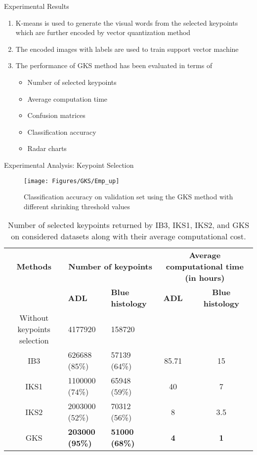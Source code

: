 \documentclass [9pt,times] {beamer}
\begin{document}
\begin{frame}{Experimental Results}
\begin{enumerate}
			\item K-means is used to generate the visual words from the selected keypoints which are further encoded by vector quantization method
			\item The encoded images with labels are used to train support vector machine			
			\item The performance of GKS method has been evaluated in terms of 
			\begin{itemize}
\fontsize{7pt}{9pt}\selectfont
			\item Number of selected keypoints
			\item Average computation time 
			\item Confusion matrices
			\item Classification accuracy
			\item Radar charts
			\end{itemize}
\end{enumerate}


\end{frame}

\begin{frame}[plain]{Experimental Analysis: Keypoint Selection}

\begin{figure}
			\centering
			\texttt{[image: Figures/GKS/Emp\_up]}
			\caption{{\scriptsize Classification accuracy on validation set using the GKS method with different shrinking threshold values}}\label{fig:emp}
\end{figure}



\begin{block}{}
\begin{table}
\centering
\scriptsize
\caption{{\scriptsize Number of selected keypoints returned by IB3, IKS1, IKS2, and GKS on considered datasets along with their average computational cost.}}
\begin{tabular}{cll|cc}
    \hline
    
\textbf{Methods}    & \multicolumn{2}{c}{ \textbf{Number of keypoints}} &  \multicolumn{2}{|c}{\textbf{Average computational time (in hours)}}   \\
\cline{2-5}
&\textbf{ADL}&\textbf{Blue histology}&\textbf{ADL}&\textbf{Blue histology}\\
\hline
Without keypoints selection        &    4177920    &    158720    \\
IB3 &  626688 (85\%) & 57139 (64\%) &85.71 & 15\\ 
IKS1        &    1100000 (74\%)    &    65948 (59\%)  & 40& 7    \\
IKS2        &    2003000 (52\%) &    70312 (56\%)     & 8 &3.5\\    
GKS        &    \textbf{203000 (95\%)}     &\textbf{51000 (68\%)}    &  \textbf{4} &\textbf{1}    \\
\hline
\end{tabular}
\label{tab:selectK}
\end{table}
\end{block}
\end{frame}
\end{document}
